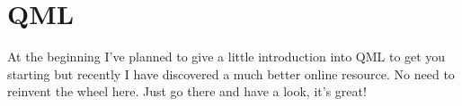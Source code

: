 %
\section{QML}
%
At the beginning I've planned to give a little introduction into QML to get you starting but recently I have discovered a much better online resource\cite{qml01}. No need to reinvent the wheel here. Just go there and have a look, it's great! 
%
